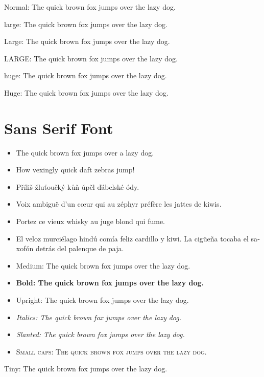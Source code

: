{\normalsize Normal: The quick brown fox jumps over the lazy dog.}

{\large large: The quick brown fox jumps over the lazy dog.}

{\Large Large: The quick brown fox jumps over the lazy dog.}

{\LARGE LARGE: The quick brown fox jumps over the lazy dog.}

{\huge huge: The quick brown fox jumps over the lazy dog.}

{\Huge Huge: The quick brown fox jumps over the lazy dog.}

\section{Sans Serif Font}
\sffamily
\blindtext
\begin{itemize}
    \item The quick brown fox jumps over a lazy dog.
    \item How vexingly quick daft zebras jump!
    \item \foreignlanguage{czech}{Příliš žluťoučký kůň úpěl ďábelské ódy.}
    \item \foreignlanguage{french}{Voix ambiguë d'un cœur qui au zéphyr préfère les jattes de kiwis.}
    \item \foreignlanguage{french}{Portez ce vieux whisky au juge blond qui fume.}
    \item \foreignlanguage{spanish}{El veloz murciélago hindú comía feliz cardillo y kiwi. La cigüeña tocaba el saxofón detrás del palenque de paja.}
\end{itemize}
\begin{itemize}
    \item \textmd{Medium: The quick brown fox jumps over the lazy dog.}
    \item \textbf{Bold: The quick brown fox jumps over the lazy dog.}
    \item \textup{Upright: The quick brown fox jumps over the lazy dog.}
    \item \textit{Italics: The quick brown fox jumps over the lazy dog.}
    \item \textsl{Slanted: The quick brown fox jumps over the lazy dog.}
    \item \textsc{Small caps: The quick brown fox jumps over the lazy dog.}
\end{itemize}

{\tiny Tiny: The quick brown fox jumps over the lazy dog.}

